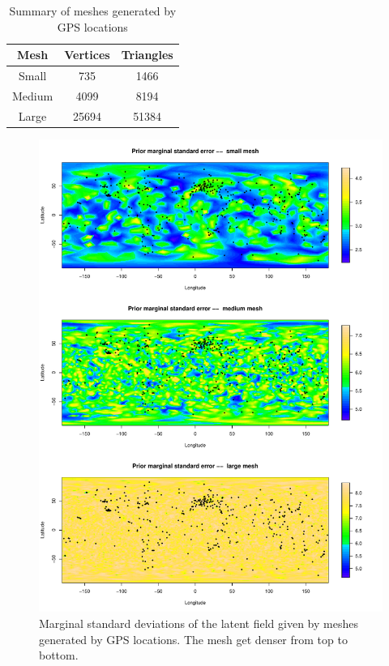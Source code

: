 \documentclass[a4paper,12pt]{article}
\begin{document}
\begin{table}[htbp] 
\centering
\caption{Summary of meshes generated by GPS locations}\label{tab:GPS_mesh}
\begin{tabular}{ c| c c }
\hline
 Mesh     & Vertices & Triangles \\\hline
 Small  &  735 & 1466 \\ 
 Medium & 4099 & 8194 \\  
 Large  & 25694 & 51384 \\   \hline
\end{tabular}
\end{table}

\begin{figure}[htbp]
 \begin{center}
 \includegraphics[scale=0.8]{fig/prior_GPSmesh.pdf}
 \end{center}
 \caption[GPS mesh]{Marginal standard deviations of the latent field given by meshes generated by GPS locations. The mesh get denser from top to bottom.}
 \label{fig:GPS_mesh}
 \end{figure}
\end{document}
